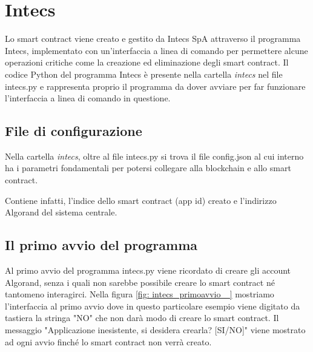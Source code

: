 \section{Intecs}
Lo smart contract viene creato e gestito da Intecs SpA attraverso il programma Intecs, implementato con un'interfaccia a linea di comando per permettere alcune operazioni critiche come la creazione ed eliminazione degli smart contract. Il codice Python del programma Intecs è presente nella cartella \textit{intecs} nel file intecs.py e rappresenta proprio il programma da dover avviare per far funzionare l'interfaccia a linea di comando in questione.

\subsection{File di configurazione}
Nella cartella \textit{intecs}, oltre al file intecs.py si trova il file config.json al cui interno ha i parametri fondamentali per potersi collegare alla blockchain e allo smart contract. 

Contiene infatti, l'indice dello smart contract (app id) creato e l'indirizzo Algorand del sistema centrale.

\subsection{Il primo avvio del programma}
Al primo avvio del programma intecs.py viene ricordato di creare gli account Algorand, senza i quali non sarebbe possibile creare lo smart contract né tantomeno interagirci. Nella figura \ref{fig: intecs_primoavvio_ } mostriamo l'interfaccia al primo avvio dove in questo particolare esempio viene digitato da tastiera la stringa "NO" che non darà modo di creare lo smart contract.
Il messaggio "Applicazione inesistente, si desidera crearla? [SI/NO]" viene mostrato ad ogni avvio finché lo smart contract  non verrà creato.
 
